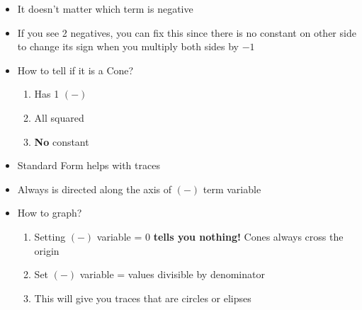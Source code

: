 \documentclass{article}
\begin{document}
\begin{itemize}
  \item It doesn't matter which term is negative
  \item If you see 2 negatives, you can fix this since there is no constant on other side to change its sign when you multiply both sides by $-1$
  \item How to tell if it is a Cone?
  \begin{enumerate}
    \item Has 1 $(-)$
    \item All squared
    \item \textbf{No} constant
  \end{enumerate}
  \item Standard Form helps with traces
  \item Always is directed along the axis of $(-)$ term variable
  \item How to graph?
  \begin{enumerate}
    \item Setting $(-)$ variable = 0 \textbf{tells you nothing!} Cones always cross the origin
    \item Set $(-)$ variable = values divisible by denominator
    \item This will give you traces that are circles or elipses
  \end{enumerate}
\end{itemize}
\end{document}
